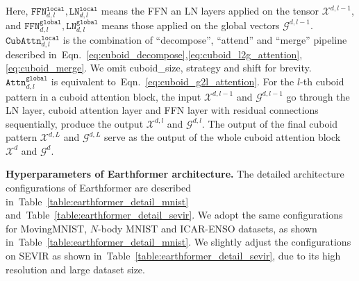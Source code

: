 \documentclass{article}
\newcommand{\tabref}[1]{Table~\ref{#1}}
\newcommand{\eqnref}[1]{Eqn.~\ref{#1}}
\renewcommand{\paragraph}[1]{\textbf{#1. }}
\def\nbody{$N$-body MNIST}
\begin{document}
 Here, $\mathtt{FFN}_{d,l}^{\mathtt{local}}, \mathtt{LN}_{d,l}^{\mathtt{local}}$ means the FFN an LN layers applied on the tensor $\mathcal{X}^{d,l-1}$, and $\mathtt{FFN}_{d,l}^{\mathtt{global}}, \mathtt{LN}_{d,l}^{\mathtt{global}}$ means those applied on the global vectors $\mathcal{G}^{d,l-1}$. 
$\mathtt{CubAttn}_{d,l}^{\mathtt{local}}$ is the combination of ``decompose'', ``attend'' and ``merge'' pipeline described in~\eqnref{eq:cuboid_decompose},\ref{eq:cuboid_l2g_attention},\ref{eq:cuboid_merge}.
 We omit cuboid\_size, strategy and shift for brevity.
 $\mathtt{Attn}_{d,l}^{\mathtt{global}}$ is equivalent to~\eqnref{eq:cuboid_g2l_attention}.
 For the $l$-th cuboid pattern in a cuboid attention block, the input $\mathcal{X}^{d,l-1}$ and $\mathcal{G}^{d,l-1}$ go through the LN layer, cuboid attention layer and FFN layer with residual connections sequentially, produce the output $\mathcal{X}^{d,l}$ and $\mathcal{G}^{d,l}$. 
 The output of the final cuboid pattern $\mathcal{X}^{d,L}$ and $\mathcal{G}^{d,L}$ serve as the output of the whole cuboid attention block $\mathcal{X}^{d}$ and $\mathcal{G}^{d}$.

\paragraph{Hyperparameters of Earthformer architecture}
The detailed architecture configurations of Earthformer are described in~\tabref{table:earthformer_detail_mnist} and~\tabref{table:earthformer_detail_sevir}. We adopt the same configurations for MovingMNIST, \nbody{} and ICAR-ENSO datasets, as shown in~\tabref{table:earthformer_detail_mnist}. We slightly adjust the configurations on SEVIR as shown in~\tabref{table:earthformer_detail_sevir}, due to its high resolution and large dataset size.
\end{document}
